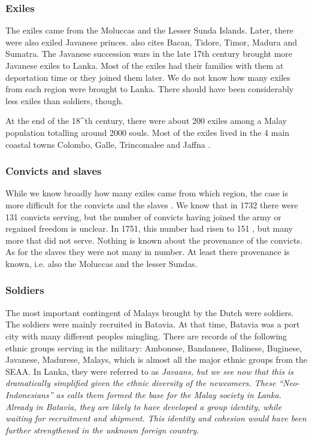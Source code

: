 \subsubsection{Exiles}\label{sec:slmbg:Exiles}
The exiles came from the Moluccas and the Lesser Sunda Islands.
Later, there were also exiled Javanese princes. \citet[7]{Bichsel}
also cites Bacan, Tidore, Timor, Madura and Sumatra. The Javanese
succession wars in the late 17th century brought more Javanese
exiles to Lanka. Most of the exiles had their families with them
at deportation time or they joined them later. We do not know how
many exiles from each region were brought to Lanka. There should have been considerably less exiles than
soldiers, though.


At the end of the 18^{th} century, there were about 200 exiles among a Malay population totalling around 2000 souls. Most of the exiles lived in the 4 main coastal towns Colombo, Galle, Trincomalee and Jaffna \citep[39f]{Hussainmiya1990}.

\subsubsection{Convicts and slaves}\label{sec:slmbg:Convictsandslaves}
While we know broadly how many exiles came from which region, the case is more difficult for the convicts and the slaves \citep[47]{Hussainmiya1987}. We know that in 1732 there were 131 convicts serving, but the number of convicts having joined the army or regained freedom is unclear. In 1751, this number had risen to 151 \citep[44]{Hussainmiya1990}, but many more that did not serve. Nothing is known about the provenance of the convicts\kuckn. As for the slaves they were not many in number. At least there provenance is known, i.e.  also the Moluccas and the lesser Sundas.

\subsubsection{Soldiers}\label{sec:slmbg:Soldiers}
The most important contingent of Malays brought by the Dutch were
soldiers.  The soldiers were mainly recruited in Batavia. At that
time, Batavia was a port city with many different peoples
mingling.  There are records of the following ethnic groups
serving in the military: Ambonese, Bandanese, Balinese, Buginese,
Javanese, Madurese, Malays, which is almost all the major ethnic
groups from the SEAA\kuckn.  In Lanka, they were referred to as
\em  Javaans\em, but we see now that this is dramatically
simplified given the ethnic diversity of the newcomers. These
``Neo-Indonesians'' as \citet[57]{Hussainmiya1987} calls them
formed the base for the Malay society in Lanka. Already in
Batavia, they are likely to have developed a group identity, while
waiting for recruitment and shipment. This identity and cohesion
would have been further strengthened  in the unknown foreign
country.

